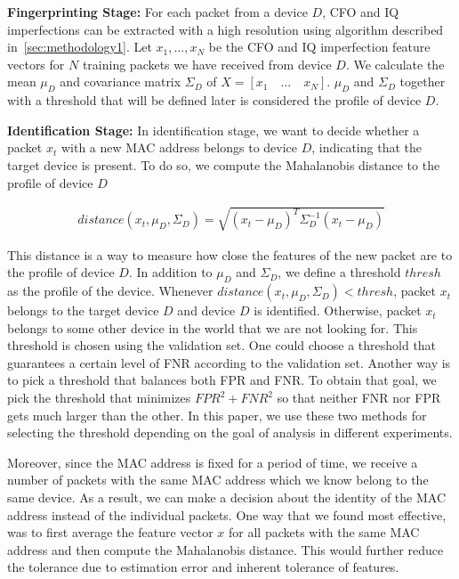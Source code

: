 \vspace{0.5em}
\noindent\textbf{Fingerprinting Stage:} For each packet from a device $D$, CFO and IQ imperfections can be extracted with a high resolution using algorithm described in~\ref{sec:methodology1}. Let $x_1,...,x_N$ be the CFO and IQ imperfection feature vectors for $N$ training packets we have received from device $D$. We calculate the mean $\mu_D$ and covariance matrix $\Sigma_D$ of $X = [x_1 \quad ... \quad x_N]$. $\mu_D$ and $\Sigma_D$ together with a threshold that will be defined later is considered the profile of device $D$.

\noindent\textbf{Identification Stage:} In identification stage, we want to decide whether a packet $x_t$ with a new MAC address belongs to device $D$, indicating that the target device is present. To do so, we compute the Mahalanobis distance to the profile of device $D$

\begin{gather*}
    distance(x_t,\mu_D,\Sigma_D) = \sqrt{(x_t-\mu_D)^T\Sigma_D^{-1}(x_t-\mu_D)}
\end{gather*}


This distance is a way to measure how close the features of the new packet are to the profile of device $D$. In addition to $\mu_D$ and $\Sigma_D$, we define a threshold $thresh$ as the profile of the device. Whenever $distance(x_t,\mu_D,\Sigma_D)<thresh$, packet $x_t$ belongs to the target device $D$ and device $D$ is identified. Otherwise, packet $x_t$ belongs to some other device in the world that we are not looking for. This threshold is chosen using the validation set. One could choose a threshold that guarantees a certain level of FNR according to the validation set. Another way is to pick a threshold that balances both FPR and FNR. To obtain that goal, we pick the threshold that minimizes $FPR^2+FNR^2$ so that neither FNR nor FPR gets much larger than the other. In this paper, we use these two methods for selecting the threshold depending on the goal of analysis in different experiments.


Moreover, since the MAC address is fixed for a period of time, we receive a number of packets with the same MAC address which we know belong to the same device. As a result, we can make a decision about the identity of the MAC address instead of the individual packets. One way that we found most effective, was to first average the feature vector $x$ for all packets with the same MAC address and then compute the Mahalanobis distance. This would further reduce the tolerance due to estimation error and inherent tolerance of features.

